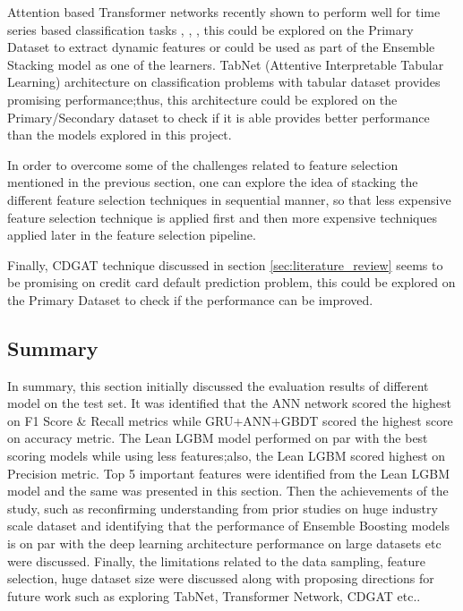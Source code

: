 \documentclass[twoside,11pt,a4paper]{article}
\begin{document}
Attention based Transformer networks recently shown to perform well for time series based classification tasks \citep{wen2022transformers}, \citep{lim2021temporal}, \citep{cholakov2021transformers}, this could be explored on the Primary Dataset to extract dynamic features or could be used as part of the Ensemble Stacking model as one of the learners. TabNet (Attentive Interpretable Tabular Learning)\citep{arik2021tabnet} architecture on classification problems with tabular dataset provides promising performance;thus, this architecture could be explored on the Primary/Secondary dataset to check if it is able  provides better performance than the models explored in this project.

In order to overcome some of the challenges related to feature selection mentioned in the previous section, one can explore the idea of stacking the different feature selection techniques in sequential manner, so that less expensive feature selection technique is applied first and then more expensive techniques applied later in the feature selection pipeline.

Finally, CDGAT \citep{wu2022cdgat} technique discussed in section \ref{sec:literature_review} seems to be promising on credit card default prediction problem, this could be explored on the Primary Dataset to check if the performance can be improved.


\subsection{Summary}
In summary, this section initially discussed the evaluation results of different model on the test set. It was identified that the \acs{ANN} network scored the highest on F1 Score \& Recall metrics while \acs{GRU}+\acs{ANN}+\acs{GBDT} scored the highest score on accuracy metric. The Lean \acs{LGBM} model performed on par with the best scoring models while using less features;also, the Lean \acs{LGBM} scored highest on Precision metric. Top 5 important features were identified from the Lean \acs{LGBM} model and the same was presented in this section.
Then the achievements of the study, such as reconfirming understanding from prior studies on huge industry scale dataset and identifying that the performance of Ensemble Boosting models is on par with the deep learning architecture performance on large datasets etc were discussed.
Finally, the limitations related to the data sampling, feature selection, huge dataset size were discussed along with proposing directions for future work such as exploring TabNet, Transformer Network, CDGAT etc..
\vfill
\clearpage
\end{document}
